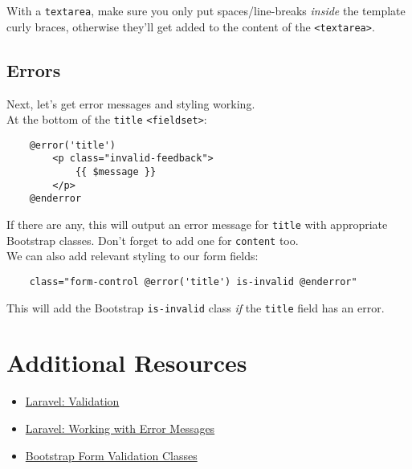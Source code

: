 With a \texttt{textarea}, make sure you only put spaces/line-breaks \textit{inside} the template curly braces, otherwise they'll get added to the content of the \texttt{<textarea>}.


\subsection{Errors}

Next, let's get error messages and styling working.
\\

At the bottom of the \texttt{title} \texttt{<fieldset>}:

\begin{verbatim}
    @error('title')
        <p class="invalid-feedback">
            {{ $message }}
        </p>
    @enderror
\end{verbatim}

If there are any, this will output an error message for \texttt{title} with appropriate Bootstrap classes. Don't forget to add one for \texttt{content} too.
\\

We can also add relevant styling to our form fields:

\begin{verbatim}
    class="form-control @error('title') is-invalid @enderror"
\end{verbatim}

This will add the Bootstrap \texttt{is-invalid} class \textit{if} the \texttt{title} field has an error.


\section{Additional Resources}

\begin{itemize}[leftmargin=*]
    \item \href{http://laravel.com/docs/master/validation}{Laravel: Validation}
    \item \href{http://laravel.com/docs/master/validation#working-with-error-messages}{Laravel: Working with Error Messages}
    \item \href{https://getbootstrap.com/docs/4.0/components/forms/#server-side}{Bootstrap Form Validation Classes}
\end{itemize}
